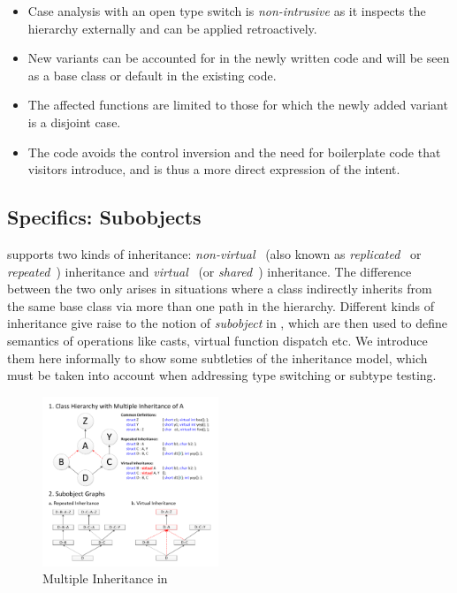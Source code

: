 \begin{itemize}
\setlength{\itemsep}{0pt}
\setlength{\parskip}{0pt}
\item Case analysis with an open type switch is \emph{non-intrusive} as it 
      inspects the hierarchy externally and can be applied retroactively. 
\item New variants can be accounted for in the newly written code and will be 
      seen as a base class or default in the existing code.
\item The affected functions are limited to those for which the newly added 
      variant is a disjoint case.
\item The code avoids the control inversion and the need for boilerplate code 
      that visitors introduce, and is thus a more direct expression of the 
      intent.
\end{itemize}

\subsection{\Cpp{} Specifics: Subobjects}
\label{sec:specifics}

\Cpp{} supports two kinds of inheritance: \emph{non-virtual}~\cite{CPPARM90} (also 
known as \emph{replicated}~\cite{RF95} or \emph{repeated}~\cite{WNST06}) 
inheritance and \emph{virtual}~\cite{CPPARM90} (or \emph{shared}~\cite{WNST06}) 
inheritance. The difference between the two only arises in situations where a 
class indirectly inherits from the same base class via more than one path in the 
hierarchy. Different kinds of inheritance give raise to the notion of 
\emph{subobject} in \Cpp{}, which are then used to define semantics of operations 
like casts, virtual function dispatch etc. We introduce them here informally to 
show some subtleties of the \Cpp{} inheritance model, which must be taken into 
account when addressing type switching or subtype testing.

\begin{figure}[htbp]
  \centering
    \includegraphics[width=0.47\textwidth]{Inheritance.pdf}
  \caption{Multiple Inheritance in \Cpp{}}
  \label{fig:inheritance}
\end{figure}

